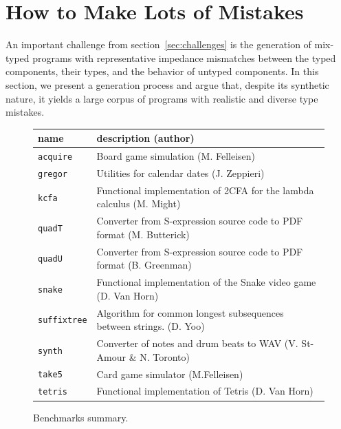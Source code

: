 \section{How to Make Lots of Mistakes} \label{sec:mutate}

An important challenge from section~\ref{sec:challenges} is the generation of
mix-typed programs with representative impedance mismatches between
the typed components, their types, and the behavior of untyped components. In this section, we
present a generation process and argue that, despite its synthetic
nature, it yields a large corpus of programs with  realistic and diverse type mistakes.


\begin{figure}
\begin{tabular}{p{2cm} | p{10cm} }
  {\bf  name} & {\bf description (author)}  \\

\hline

  \texttt{acquire} & Board game simulation (M. Felleisen)  \\%


\hline
  \texttt{gregor} & Utilities for calendar dates (J. Zeppieri) \\%


\hline
  \texttt{kcfa} & Functional implementation of 2CFA for the lambda calculus (M. Might) \\%


\hline
  \texttt{quadT} & Converter from S-expression source code to PDF format (M. Butterick)\\%

\hline
  \texttt{quadU} & Converter from S-expression source code to PDF format  (B. Greenman) \\%

\hline
  \texttt{snake} & Functional implementation of the  Snake video game (D. Van Horn) \\%

\hline
  \texttt{suffixtree} & Algorithm for common longest subsequences between strings. (D. Yoo) \\%

\hline
  \texttt{synth} & Converter of notes and drum beats to WAV (V. St-Amour \& N. Toronto) \\%

\hline
  \texttt{take5} & Card game simulator (M.Felleisen)  \\%

\hline
  \texttt{tetris} & Functional implementation of Tetris (D. Van Horn) \\%


\end{tabular}
  \caption{Benchmarks summary.}
  \label{table:benchmark-descriptions}
\end{figure}


